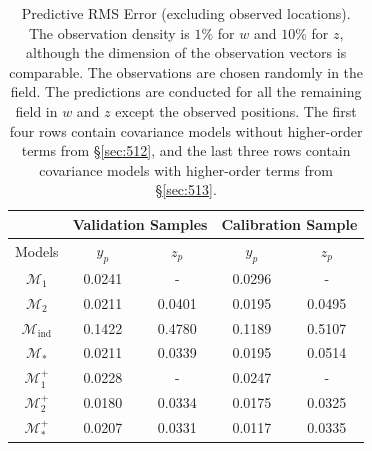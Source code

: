 \documentclass[article,ij4uq]{ij4uq}              %
\begin{document}
\begin{table}[!t]
\centering
 \caption{Predictive RMS Error (excluding observed locations). The observation density is $1\%$ for $w$ and $10\%$ for $z$, although the dimension of the observation vectors is comparable. The observations are chosen randomly in the field. The predictions are conducted for all the remaining field in $w$ and $z$ except the observed positions. The first four rows contain covariance models without higher-order terms from \S \ref{sec:512}, and the last three rows contain covariance models with higher-order terms from \S \ref{sec:513}.}\label{table:1}
\begin{tabular}{|c|c|c|c|c|}
\hline
 & \multicolumn{2}{c}{Validation Samples} & \multicolumn{2}{|c|}{Calibration Sample}\\
 \hline
 Models  & $y_{p}$ & $z_{p}$ & $y_{p}$ & $z_{p}$\\
\hline
\hline
$\mathcal{M}_{1}$  & 0.0241 & - & 0.0296 & - \\
\hline
$\mathcal{M}_{2}$  & 0.0211 & 0.0401 & 0.0195 & 0.0495 \\
\hline
$\mathcal{M}_{\mathrm{ind}}$  & 0.1422 & 0.4780 & 0.1189 & 0.5107 \\
\hline
$\mathcal{M}_{*}$  & 0.0211 & 0.0339 & 0.0195 & 0.0514 \\
\hline
\hline
$\mathcal{M}_{1}^{+}$  & 0.0228 & - & 0.0247 & - \\
\hline
$\mathcal{M}_{2}^{+}$ & 0.0180 & 0.0334 & 0.0175 & 0.0325 \\
\hline
$\mathcal{M}_{*}^{+}$ & 0.0207 & 0.0331 & 0.0117 & 0.0335 \\
\hline
\end{tabular}
\end{table}
\end{document}
